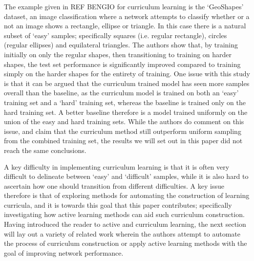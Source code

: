 The example given in REF BENGIO  for curriculum learning is the `GeoShapes' dataset, an image classification where a network attempts to classify whether or a not an image shows a rectangle, ellipse or triangle. In this case there is a natural subset of `easy' samples; specifically squares (i.e. regular rectangle), circles (regular ellipses) and equilateral triangles. The authors show that, by training initially on only the regular shapes, then transitioning to training on harder shapes, the test set performance is significantly improved compared to training simply on the harder shapes for the entirety of training. One issue with this study is that it can be argued that the curriculum trained model has seen more samples overall than the baseline, as the curriculum model is trained on both an `easy' training set and a `hard' training set, whereas the baseline is trained only on the hard training set. A better baseline therefore is a model trained uniformly on the union of the easy and hard training sets. While the authors do comment on this issue, and claim that the curriculum method still outperform uniform sampling from the combined training set, the results we will set out in this paper did not reach the same conclusions. 

A key difficulty in implementing curriculum learning is that it is often very difficult to delineate between `easy' and `difficult' samples, while it is also hard to ascertain how one should transition from different difficulties. A key issue therefore is that of exploring methods for  automating the construction of learning curricula, and it is towards this goal that this paper contributes; specifically investigating how active learning methods can aid such curriculum construction. Having introduced the reader to active and curriculum learning, the next section will lay out a variety of related work wherein the authors attempt to automate the process of curriculum construction or apply active learning methods with the goal of improving network performance. 

